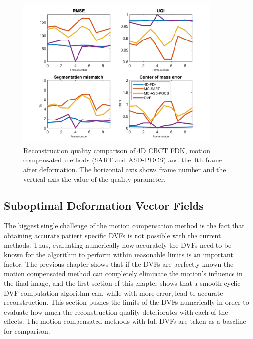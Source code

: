 \begin{figure}
\begin{center}

\includegraphics[width=0.9\textwidth]{accuracyMC/MCCBCTparams.png} 


\end{center}

\caption[Reconstruction quality comparison of motion compensation]{\label{fig:MCCBCTquality} Reconstruction quality comparison of 4D CBCT FDK, motion compensated methods (SART and ASD-POCS) and the 4th frame after deformation. The horizontal axis shows frame number and the vertical axis the value of the quality parameter.} 
\end{figure}

\subsection{Suboptimal Deformation Vector Fields}
The biggest single challenge of the motion compensation method is the fact that obtaining accurate patient specific DVFs is not possible with the current methods. Thus, evaluating numerically how accurately the DVFs need to be known for the algorithm to perform within reasonable limits is an important factor. The previous chapter shows that if the DVFs are perfectly known the motion compensated method can completely eliminate the motion's influence in the final image, and the first section of this chapter shows that a smooth cyclic DVF computation algorithm can, while with more error, lead to accurate reconstruction. This section pushes the limits of the DVFs numerically in order to evaluate how much the reconstruction quality deteriorates with each of the effects. The motion compensated methods with full DVFs are taken as a baseline for comparison.

